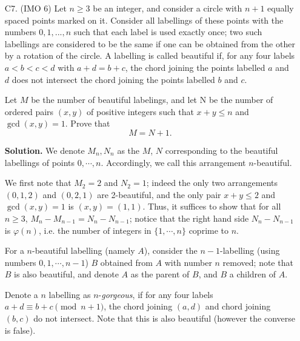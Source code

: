 \documentclass[11pt,a4paper]{article}
\begin{document}
\begin{enumerate}
	\item [C7.] (IMO 6) 
	Let $n \ge 3$ be an integer, and consider a circle with $n + 1$ equally spaced points marked on it. Consider all labellings of these points with the numbers $0, 1, ... , n$ such that each label is used exactly once; two such labellings are considered to be the same if one can be obtained from the other by a rotation of the circle. A labelling is called beautiful if, for any four labels $a < b < c < d$ with $a + d = b + c$, the chord joining the points labelled $a$ and $d$ does not intersect the chord joining the points labelled $b$ and $c$.
	
	Let $M$ be the number of beautiful labelings, and let N be the number of ordered pairs $(x, y)$ of positive integers such that $x + y \le n$ and $\gcd(x, y) = 1$. Prove that$$M = N + 1.$$
	
	\textbf{Solution.} 
	We denote $M_n, N_n$ as the $M$, $N$ corresponding to the beautiful labellings of points $0, \cdots, n$. 
	Accordingly, we call this arrangement $n$-beautiful. 
	
	We first note that $M_2 = 2$ and $N_2 = 1$; 
	indeed the only two arrangements $(0,1,2)$ and $(0, 2, 1)$ are 2-beautiful, 
	and the only pair $x+y\le 2$ and $\gcd(x, y) = 1$ is $(x, y) = (1, 1)$. 
	Thus, it suffices to show that for all $n\ge 3$, $M_n - M_{n - 1} = N_n - N_{n - 1}$; 
	notice that the right hand side $N_n - N_{n - 1}$ is $\varphi(n)$, 
	i.e. the number of integers in $\{1, \cdots, n\}$ coprime to $n$. 
	
	For a $n$-beautiful labelling (namely $A$), consider the $n - 1$-labelling (using numbers $0, 1, \cdots, n - 1$) $B$ obtained from $A$ with number $n$ removed; 
	note that $B$ is also beautiful, and denote $A$ as the parent of $B$, and $B$ a children of $A$. 
	
	Denote a $n$ labelling as $n$-\emph{gorgeous}, if for any four labels $a + d\equiv b + c\pmod{n + 1}$, 
	the chord joining $(a, d)$ and chord joining $(b, c)$ do not intersect. 
	Note that this is also beautiful (however the converse is false). 
	

\end{enumerate}
\end{document}
